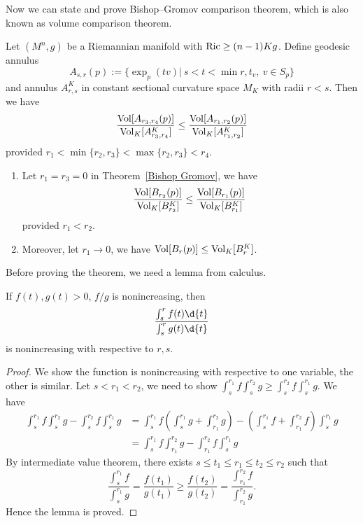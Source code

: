Now we can state and prove Bishop--Gromov comparison theorem, which is also known as volume comparison theorem.
\begin{thm}\label{Bishop Gromov}
    Let $(M^n,g)$ be a Riemannian manifold with $\operatorname{Ric}\geq(n-1)Kg$.
    Define geodesic annulus
    \[A_{s,r}(p):=\{\exp_p(tv)|\ s<t<\min{r,t_v},\ v\in S_p\}\]
    and annulus $A^K_{r,s}$ in constant sectional curvature space $M_K$ with radii $r<s$.
    Then we have
    \[\frac{\operatorname{Vol}[A_{r_3,r_4}(p)]}{\operatorname{Vol}_K[A^K_{r_3,r_4}]}\leq\frac{\operatorname{Vol}[A_{r_1,r_2}(p)]}{\operatorname{Vol}_K[A^K_{r_1,r_2}]}\]
    provided $r_1<\min\{r_2,r_3\}<\max\{r_2,r_3\}<r_4$.
\end{thm}

\begin{cor}
    \begin{enumerate}[(1)]
        \item Let $r_1=r_3=0$ in Theorem~\ref{Bishop Gromov}, we have
        \[\frac{\operatorname{Vol}[B_{r_2}(p)]}{\operatorname{Vol}_K[B_{r_2}^K]}\leq\frac{\operatorname{Vol}[B_{r_1}(p)]}{\operatorname{Vol}_K[B_{r_1}^K]}\]
        provided $r_1<r_2$.
        \item Moreover, let $r_1\to 0$, we have $\operatorname{Vol}[B_r(p)]\leq\operatorname{Vol}_K[B_r^K]$.
    \end{enumerate}
\end{cor}

Before proving the theorem, we need a lemma from calculus.
\begin{lem}
    If $f(t),g(t)>0$, $f/g$ is nonincreasing, then
    \[\frac{\int_s^rf(t)\d{t}}{\int_s^rg(t)\d{t}}\]
    is nonincreasing with respective to $r,s$.
\end{lem}
\begin{proof}
    We show the function is nonincreasing with respective to one variable, the other is similar.
    Let $s<r_1<r_2$, we need to show $\int_s^{r_1}f\int_s^{r_2}g\geq\int_s^{r_2}f\int_s^{r_1}g$.
    We have
    \begin{align*}
        \int_s^{r_1}f\int_s^{r_2}g-\int_s^{r_2}f\int_s^{r_1}g&=\int_s^{r_1}f\left(\int_s^{r_1}g+\int_{r_1}^{r_2}g\right)-\left(\int_s^{r_1}f+\int_{r_1}^{r_2}f\right)\int_s^{r_1}g\\
        &=\int_s^{r_1}f\int_{r_1}^{r_2}g-\int_{r_1}^{r_2}f\int_s^{r_1}g
    \end{align*}
    By intermediate value theorem, there exists $s\leq t_1\leq r_1\leq t_2\leq r_2$ such that
    \[\frac{\int_s^{r_1}f}{\int_s^{r_1}g}=\frac{f(t_1)}{g(t_1)}\geq\frac{f(t_2)}{g(t_2)}=\frac{\int_{r_1}^{r_2}f}{\int_{r_1}^{r_2}g}.\]
    Hence the lemma is proved.
\end{proof}

